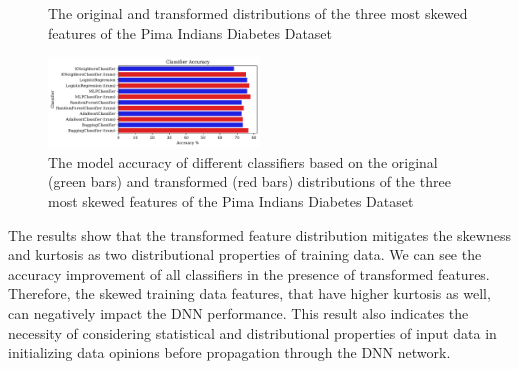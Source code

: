 {\begin{figure}[!ht]
	\caption{The original and transformed distributions of the three most skewed features of the Pima Indians Diabetes Dataset}
\end{figure}
\begin{figure}[!ht]  %
	\centering
	\includegraphics[width=0.5\textwidth]{figures/classifiers.pdf}
	\vspace{-0.7cm}
	\caption{The model accuracy of different classifiers based on the original (green bars) and transformed (red bars) distributions of the three most skewed features of the Pima Indians Diabetes Dataset}
\end{figure}
The results show that the transformed feature distribution mitigates the skewness and kurtosis as two distributional properties of training data. We can see the accuracy improvement of all classifiers in the presence of transformed features. Therefore, the skewed training data features, that have higher kurtosis as well, can negatively impact the DNN performance. This result also indicates the necessity of considering statistical and distributional properties of input data in initializing data opinions before propagation through the DNN network. 
}

